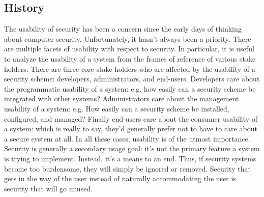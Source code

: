 \documentclass{sig-alternate}
\begin{document}
\subsection{History}

The usability of security has been a concern since the early days of
thinking about computer security. Unfortunately, it hasn't always been
a priority. There are multiple facets of usability with respect to
security. In particular, it is useful to analyze the usability of a
system from the frames of reference of various stake holders.  There
are three core stake holders who are affected by the usability of a
security scheme: developers, administrators, and end-users.
Developers care about the programmatic usability of a system: e.g. how
easily can a security scheme be integrated with other systems?
Administrators care about the management usability of a system:
e.g. How easily can a security scheme be installed, configured, and
managed? Finally end-users care about the consumer usability of a
system: which is really to say, they'd generally prefer not to have to
care about a secure system at all. In all these cases, usability is of
the utmost importance. Security is generally a secondary usage goal:
it's not the primary feature a system is trying to implement. Instead,
it's a means to an end. Thus, if security systems become too
burdensome, they will simply be ignored or removed. Security that gets
in the way of the user instead of naturally accommodating the user is
security that will go unused.
\end{document}
